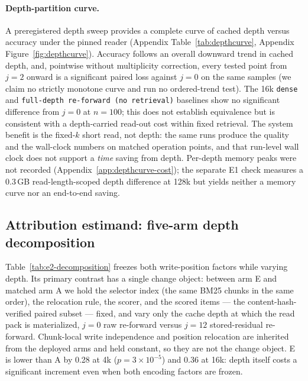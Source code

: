 \paragraph{Depth-partition curve.}
A preregistered depth sweep provides a complete curve of cached depth versus
accuracy under the pinned reader (Appendix
Table~\ref{tab:depthcurve}, Appendix Figure~\ref{fig:depthcurve}).  Accuracy follows an overall downward trend in cached
depth, and, pointwise without multiplicity correction, every tested point from
$j{=}2$ onward is a significant paired loss against $j{=}0$ on the same samples
(we claim no strictly monotone curve and run no ordered-trend test).  The 16k
\texttt{dense} and \texttt{full-depth re-forward (no retrieval)} baselines show no
significant difference from $j{=}0$ at $n{=}100$; this does not establish
equivalence but is consistent with a depth-carried read-out cost within fixed
retrieval.  The system benefit is the fixed-$k$ short read, not depth: the same
runs produce the quality and the wall-clock numbers on matched operation points,
and that run-level wall clock does not support a \emph{time} saving from depth.
Per-depth memory peaks were not recorded (Appendix~\ref{app:depthcurve-cost}); the
separate E1 check measures a 0.3\,GB read-length-scoped depth difference at 128k
but yields neither a memory curve nor an end-to-end saving.

\subsection{Attribution estimand: five-arm depth decomposition}
\label{sec:attribution}

Table~\ref{tab:e2-decomposition} freezes both write-position factors while
varying depth.  Its primary contrast has a single change object: between arm E and
matched arm A we hold the selector index (the same BM25 chunks in the same order),
the relocation rule, the scorer, and the scored items --- the
content-hash-verified paired subset --- fixed, and vary only the cache depth at
which the read pack is materialized, $j{=}0$ raw re-forward versus $j{=}12$
stored-residual re-forward.  Chunk-local write independence and position
relocation are inherited from the deployed arms and held constant, so they are not
the change object.  E is lower than A by 0.28 at 4k ($p=3\times10^{-5}$) and 0.36
at 16k: depth itself costs a significant increment even when both encoding factors
are frozen.

